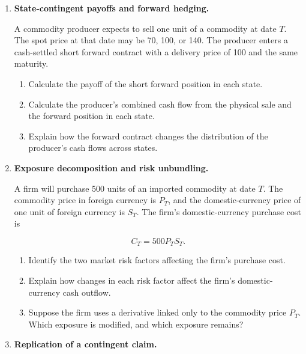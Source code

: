 \begin{enumerate}

\item \textbf{State-contingent payoffs and forward hedging.}

A commodity producer expects to sell one unit of
a commodity at date $T$. The spot price at that
date may be 70, 100, or 140. The producer enters
a cash-settled short forward contract with a
delivery price of 100 and the same maturity.

\begin{enumerate}

\item Calculate the payoff of the short forward
position in each state.

\item Calculate the producer's combined cash flow
from the physical sale and the forward position
in each state.

\item Explain how the forward contract changes
the distribution of the producer's cash flows
across states.

\end{enumerate}


\item \textbf{Exposure decomposition and risk unbundling.}

A firm will purchase 500 units of an imported
commodity at date $T$. The commodity price in
foreign currency is $P_T$, and the domestic-currency
price of one unit of foreign currency is $S_T$.
The firm's domestic-currency purchase cost is

\[
C_T=500P_TS_T.
\]

\begin{enumerate}

\item Identify the two market risk factors affecting
the firm's purchase cost.

\item Explain how changes in each risk factor affect
the firm's domestic-currency cash outflow.

\item Suppose the firm uses a derivative linked
only to the commodity price $P_T$. Which exposure
is modified, and which exposure remains?

\end{enumerate}


\item \textbf{Replication of a contingent claim.}


\end{enumerate}
